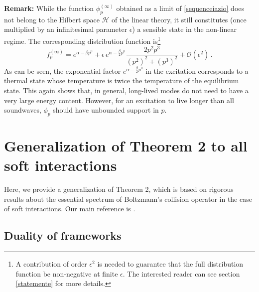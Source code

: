 \documentclass[a4paper, amsfonts, amssymb, amsmath, reprint, showkeys, nofootinbib, twoside, onecolumn,notitlepage,,longbibliography]{revtex4-2}
\theoremstyle{definition}
\theoremstyle{theorem}
\theoremstyle{corollary}
\begin{document}
\textbf{Remark:} While the function $\phi_p^{(\infty)}$ obtained as a limit of \eqref{sequenceiazio} does not belong to the Hilbert space $\mathcal{H}$ of the linear theory, it still constitutes (once multiplied by an infinitesimal parameter $\epsilon$) a sensible state in the non-linear regime. The corresponding distribution function is\footnote{A contribution of order $\epsilon^2$ is needed to guarantee that the full distribution function be non-negative at finite $\epsilon$. The interested reader can see section \ref{statemente} for more details.}
\begin{equation}
f_p^{(\infty)}= e^{\alpha-\beta p^0} + \epsilon \, e^{\alpha -\frac{\beta}{2}p^0} \dfrac{2p^2 p^3}{(p^2)^2{+}(p^3)^2} +\mathcal{O}(\epsilon^2) \, .
\end{equation}
As can be seen, the exponential factor $e^{\alpha -\frac{\beta}{2}p^0}$ in the excitation corresponds to a thermal state whose temperature is twice the temperature of the equilibrium state. This again shows that, in general, long-lived modes do not need to have a very large energy content. However, for an excitation to live longer than all soundwaves, $\phi_p$ should have unbounded support in $p$. 

\newpage





\section{Generalization of Theorem 2 to all soft interactions}

Here, we provide a generalization of Theorem 2, which is based on rigorous results about the essential spectrum of Boltzmann's collision operator in the case of soft interactions. Our main reference is \cite{Dudynski1988}.

\subsection{Duality of frameworks}\label{dualona}
\end{document}
